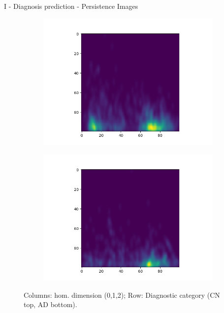 \documentclass[aspectratio=169, 10pt, dvipsnames]{beamer}
\begin{document}
\begin{frame}[fragile]{I - Diagnosis prediction - Persistence Images}
\begin{figure}
\begin{subfigure}{0.32\textwidth}
    \includegraphics[width=\textwidth]{figures/PIs/Persistence_image_AD_h_1.png}
  \end{subfigure}
  \begin{subfigure}{0.32\textwidth}
    \includegraphics[width=\textwidth]{figures/PIs/Persistence_image_AD_h_2.png}
  \end{subfigure}
  \caption{Columns: hom. dimension (0,1,2); Row: Diagnostic category (CN top, AD bottom).}
  \label{fig:sample_rep_pi}
\end{figure}

\end{frame}
\end{document}
